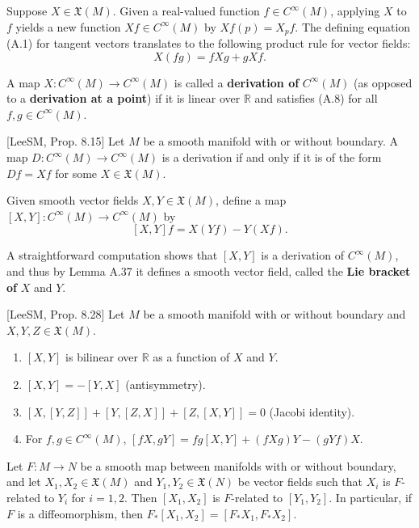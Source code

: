 Suppose $X \in \mathfrak{X}(M)$. Given a real-valued function $f \in C^\infty(M)$, applying $X$ to $f$ yields a new function $Xf \in C^\infty(M)$ by $Xf(p) = X_p f$. The defining equation (A.1) for tangent vectors translates to the following product rule for vector fields:
\begin{equation}
X(fg) = f Xg + g Xf.
\tag{A.8}
\end{equation}

A map $X : C^\infty(M) \to C^\infty(M)$ is called a \textbf{derivation of } $C^\infty(M)$ (as opposed to a \textbf{derivation at a point}) if it is linear over $\mathbb{R}$ and satisfies (A.8) for all $f, g \in C^\infty(M)$.

\begin{lemma}
\label{lem:derivation-characterization}
[LeeSM, Prop. 8.15] Let $M$ be a smooth manifold with or without boundary. A map $D : C^\infty(M) \to C^\infty(M)$ is a derivation if and only if it is of the form $Df = Xf$ for some $X \in \mathfrak{X}(M)$.
\end{lemma}

Given smooth vector fields $X, Y \in \mathfrak{X}(M)$, define a map $[X, Y] : C^\infty(M) \to C^\infty(M)$ by
\[
[X, Y]f = X(Yf) - Y(Xf).
\]

A straightforward computation shows that $[X, Y]$ is a derivation of $C^\infty(M)$, and thus by Lemma A.37 it defines a smooth vector field, called the \textbf{Lie bracket of } $X$ and $Y$.

\begin{proposition}
\label{prop:lie-bracket-properties}
[LeeSM, Prop. 8.28] Let $M$ be a smooth manifold with or without boundary and $X, Y, Z \in \mathfrak{X}(M)$.
\begin{enumerate}[label=(\alph*)]
\item $[X, Y]$ is bilinear over $\mathbb{R}$ as a function of $X$ and $Y$.
\item $[X, Y] = -[Y, X]$ (antisymmetry).
\item $[X, [Y, Z]] + [Y, [Z, X]] + [Z, [X, Y]] = 0$ (Jacobi identity).
\item For $f, g \in C^\infty(M)$, $[fX, gY] = fg[X, Y] + (fXg)Y - (gYf)X$.
\end{enumerate}
\end{proposition}

\begin{proposition}
\label{prop:naturality-of-lie-brackets}
Let $F : M \to N$ be a smooth map between manifolds with or without boundary, and let $X_1, X_2 \in \mathfrak{X}(M)$ and $Y_1, Y_2 \in \mathfrak{X}(N)$ be vector fields such that $X_i$ is $F$-related to $Y_i$ for $i = 1, 2$. Then $[X_1, X_2]$ is $F$-related to $[Y_1, Y_2]$. In particular, if $F$ is a diffeomorphism, then $F_*[X_1, X_2] = [F_* X_1, F_* X_2]$.
\end{proposition}

